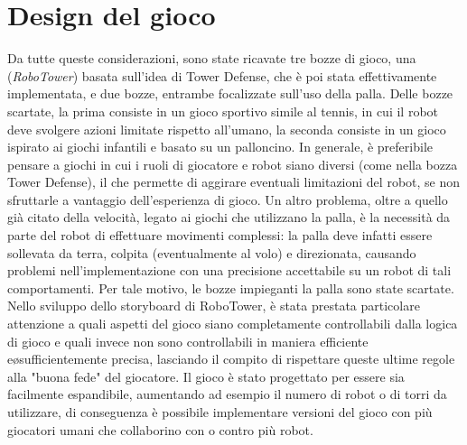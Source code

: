 \section{Design del gioco}
Da tutte queste considerazioni, sono state ricavate tre bozze di gioco, una (\emph{RoboTower}) basata sull'idea di Tower Defense, che è poi stata effettivamente implementata, e due bozze, entrambe focalizzate sull'uso della palla. Delle bozze scartate, la prima consiste in un gioco sportivo simile al tennis, in cui il robot deve svolgere azioni limitate rispetto all'umano, la seconda consiste in un gioco ispirato ai giochi infantili e basato su un palloncino.
In generale, è preferibile pensare a giochi in cui i ruoli di giocatore e robot siano diversi (come nella bozza Tower Defense), il che permette di aggirare eventuali limitazioni del robot, se non sfruttarle a vantaggio dell’esperienza di gioco.
Un altro problema, oltre a quello già citato della velocità, legato ai giochi che utilizzano la palla, è la necessità da parte del robot di effettuare movimenti complessi: la palla deve infatti essere sollevata da terra, colpita (eventualmente al volo) e direzionata, causando problemi nell'implementazione con una precisione accettabile su un robot di tali comportamenti. Per tale motivo, le bozze impieganti la palla sono state scartate.
Nello sviluppo dello storyboard di RoboTower, è stata prestata particolare attenzione a quali aspetti del gioco siano completamente controllabili dalla logica di gioco e quali invece non sono controllabili in maniera efficiente e\o sufficientemente precisa, lasciando il compito di rispettare queste ultime regole alla "buona fede" del giocatore.
Il gioco è stato progettato per essere sia facilmente espandibile, aumentando ad esempio il numero di robot o di torri da utilizzare, di conseguenza è possibile implementare versioni del gioco con più giocatori umani che collaborino con o contro più robot.
